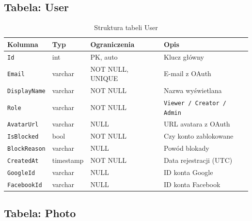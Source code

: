 \documentclass[12pt, a4paper]{article}
\begin{document}
\subsection{Tabela: User}

\begin{table}[H]
  \centering
  \caption{Struktura tabeli User}
  \begin{tabular}{@{}L{3.5cm}L{2.5cm}L{2.5cm}L{5cm}@{}}
    \toprule
    \textbf{Kolumna} & \textbf{Typ} & \textbf{Ograniczenia} & \textbf{Opis} \\
    \midrule
    \texttt{Id}          & int       & PK, auto     & Klucz główny \\
    \texttt{Email}       & varchar   & NOT NULL, UNIQUE & E-mail z OAuth \\
    \texttt{DisplayName} & varchar   & NOT NULL     & Nazwa wyświetlana \\
    \texttt{Role}        & varchar   & NOT NULL     & \texttt{Viewer / Creator / Admin} \\
    \texttt{AvatarUrl}   & varchar   & NULL         & URL avatara z OAuth \\
    \texttt{IsBlocked}   & bool      & NOT NULL     & Czy konto zablokowane \\
    \texttt{BlockReason} & varchar   & NULL         & Powód blokady \\
    \texttt{CreatedAt}   & timestamp & NOT NULL     & Data rejestracji (UTC) \\
    \texttt{GoogleId}    & varchar   & NULL         & ID konta Google \\
    \texttt{FacebookId}  & varchar   & NULL         & ID konta Facebook \\
    \bottomrule
  \end{tabular}
\end{table}

\subsection{Tabela: Photo}
\end{document}
